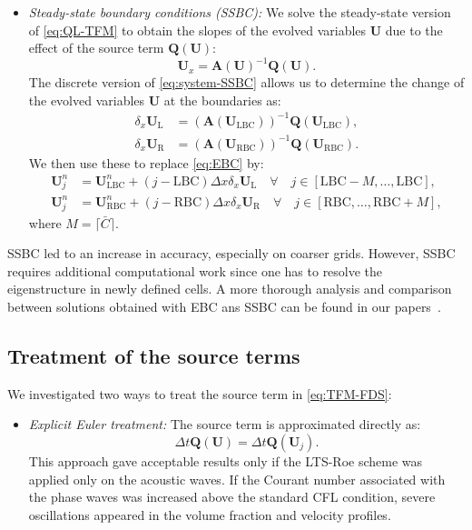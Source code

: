 {\begin{itemize}
\item \textit{Steady-state boundary conditions (SSBC):} We solve the steady-state version of \eqref{eq:QL-TFM} to obtain the slopes of the evolved variables $ \mathbf{U} $ due to the effect of the source term $ \mathbf{Q(U)} $:
\begin{equation} \label{eq:system-SSBC}
\mathbf{U}_x = \mathbf{A} (\mathbf{U})^{-1} \mathbf{Q} (\mathbf{U}).
\end{equation}
The discrete version of \eqref{eq:system-SSBC} allows us to determine the change of the evolved variables $ \mathbf{U} $ at the boundaries as:
\begin{subequations}
\begin{align}
\delta_x \mathbf{U}_\text{L} & = \left( \mathbf{A} (\mathbf{U}_\text{LBC})\right)^{-1} \mathbf{Q} (\mathbf{U}_\text{LBC}), \\
\delta_x \mathbf{U}_\text{R} & = \left( \mathbf{A} (\mathbf{U}_\text{RBC})\right)^{-1} \mathbf{Q} (\mathbf{U}_\text{RBC}).
\end{align}
\end{subequations}
We then use these to replace \eqref{eq:EBC} by:
\begin{subequations}
\begin{align}
\mathbf{U}_{j}^n & = \mathbf{U}_\text{LBC}^n + (j-\text{LBC}) \Delta x \delta_x \mathbf{U}_\text{L} \quad
\forall \quad j\in[\text{LBC}-M,\ldots,\text{LBC}], \\
\mathbf{U}_{j}^n & = \mathbf{U}_\text{RBC}^n + 
(j-\text{RBC}) \Delta x \delta_x \mathbf{U}_\text{R}
\quad \forall \quad j\in[\text{RBC},\ldots,\text{RBC}+M],
\end{align}
\end{subequations}
where $ M = \lceil \bar{C} \rceil $.
\end{itemize}
SSBC led to an increase in accuracy, especially on coarser grids. However, SSBC requires additional computational work since one has to resolve the eigenstructure in newly defined cells. A more thorough analysis and comparison between solutions obtained with EBC ans SSBC can be found in our papers~\cite{jp1,cp1}.

\subsection{Treatment of the source terms}

We investigated two ways to treat the source term in \eqref{eq:TFM-FDS}:
\begin{itemize}
\item \textit{Explicit Euler treatment:} The source term is approximated directly as:
\begin{equation} \label{eq:E-source}
\Delta t \mathbf{Q(U)} = \Delta t \mathbf{Q}(\mathbf{U}_j).
\end{equation}
This approach gave acceptable results only if the LTS-Roe scheme was applied only on the acoustic waves. If the Courant number associated with the phase waves was increased above the standard CFL condition, severe oscillations appeared in the volume fraction and velocity profiles.


\end{itemize}}
